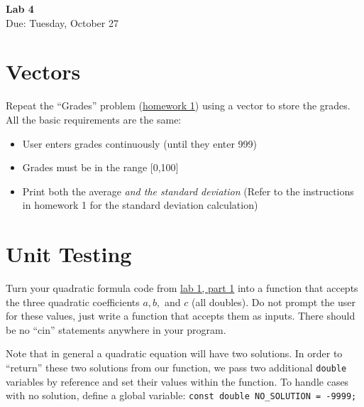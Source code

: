 \documentclass{article}
\begin{document}
\fancyfoot[C]{\thepage}
\vspace*{0cm}
\begin{center}
	{\LARGE \textbf{Lab 4}}\\
	\vspace{0.25cm}
	{\Large Due: Tuesday, October 27}
\end{center}

\section{Vectors}
Repeat the ``Grades'' problem (\href{https://drive.google.com/file/d/1SSxhoP7yIXVp6Xddpqny51gzah2msQGJ/view?usp=sharing}{homework 1}) using a vector to store the grades. All the basic requirements are the same:
\begin{itemize}
	\item User enters grades continuously (until they enter 999)
	\item Grades must be in the range [0,100]
	\item Print both the average \textit{and the standard deviation} (Refer to the instructions in homework 1 for the standard deviation calculation)
\end{itemize}

\section{Unit Testing}
Turn your quadratic formula code from \href{https://drive.google.com/file/d/1qfXRyeUBVmXkNnpzuuMdZz6LJFereyQm/view?usp=sharing}{lab 1, part 1} into a function that accepts the three quadratic coefficients $a, b, $ and $c$ (all doubles). Do not prompt the user for these values, just write a function that accepts them as inputs. There should be no ``cin'' statements anywhere in your program.

Note that in general a quadratic equation will have two solutions. In order to ``return'' these two solutions from our function, we pass two additional {\tt{double}} variables by reference and set their values within the function. To handle cases with no solution, define a global variable: { \tt const double NO\_SOLUTION = -9999; }
\end{document}
